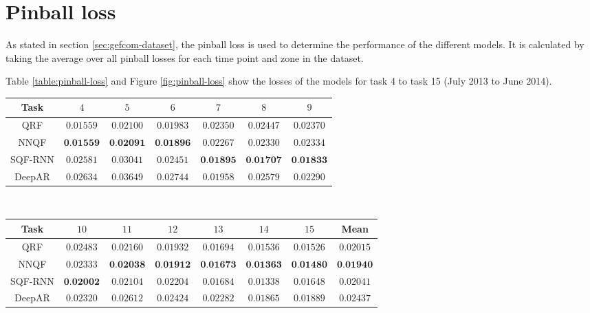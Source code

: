 \section{Pinball loss}
\label{sec:elaboration-pinball-loss}

As stated in section \ref{sec:gefcom-dataset}, the pinball loss is 
used to determine the performance of the different models. 
It is calculated by taking the average over all pinball losses for each time 
point and zone in the dataset. 

Table \ref{table:pinball-loss} and Figure \ref{fig:pinball-loss} show the 
losses of the models for task 4 to task 15 (July 2013 to June 2014). 

\begin{table}[ht]%
    \footnotesize
    \hspace*{25pt} %
    \begin{minipage}{\textwidth}
    \renewcommand{\b}[1]{\textbf{#1}}
    \begin{tabular}{c|cccccc}
        \toprule \noalign{\smallskip}
        Task & \(4\) & \(5\) & \(6\) & \(7\) & \(8\) & \(9\) \\
        \midrule
        QRF     & \(0.01559\)     & \(0.02100\)     & \(0.01983\)     & \(0.02350\)     & \(0.02447\)     & \(0.02370\)     \\
        NNQF    & \(\b{0.01559}\) & \(\b{0.02091}\) & \(\b{0.01896}\) & \(0.02267\)     & \(0.02330\)     & \(0.02334\)     \\
        SQF-RNN & \(0.02581\)     & \(0.03041\)     & \(0.02451\)     & \(\b{0.01895}\) & \(\b{0.01707}\) & \(\b{0.01833}\) \\
        DeepAR  & \(0.02634\)     & \(0.03649\)     & \(0.02744\)     & \(0.01958\)     & \(0.02579\)     & \(0.02290\)     \\
        \bottomrule
    \end{tabular}
    \vspace*{1em} \\
    \begin{tabular}{c|cccccc|c}
        \toprule \noalign{\smallskip}
        Task & \(10\) & \(11\) & \(12\) & \(13\) & \(14\) & \(15\) & Mean \\
        \midrule
        QRF     & \(0.02483\)     & \(0.02160\)     & \(0.01932\)     & \(0.01694\)     & \(0.01536\)     & \(0.01526\)     & \(0.02015\)     \\
        NNQF    & \(0.02333\)     & \(\b{0.02038}\) & \(\b{0.01912}\) & \(\b{0.01673}\) & \(\b{0.01363}\) & \(\b{0.01480}\) & \(\b{0.01940}\) \\
        SQF-RNN & \(\b{0.02002}\) & \(0.02104\)     & \(0.02204\)     & \(0.01684\)     & \(0.01338\)     & \(0.01648\)     & \(0.02041\)     \\
        DeepAR  & \(0.02320\)     & \(0.02612\)     & \(0.02424\)     & \(0.02282\)     & \(0.01865\)     & \(0.01889\)     & \(0.02437\)     \\
        \bottomrule
    \end{tabular}
    \end{minipage}


\end{table}
